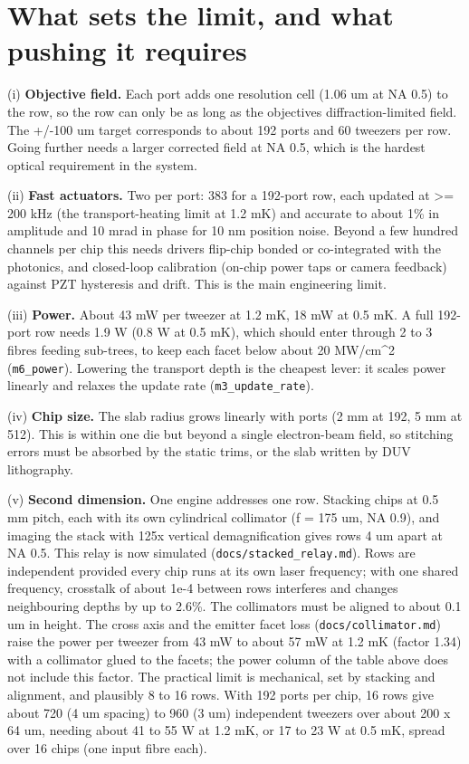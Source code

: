 \hypertarget{4-what-sets-the-limit-and-what-pushing-it-requires}{%
\section{What sets the limit, and what pushing it
requires}\label{scaling-4-what-sets-the-limit-and-what-pushing-it-requires}}

(i) \textbf{Objective field.} Each port adds one resolution cell (1.06
um at NA 0.5) to the row, so the row can only be as long as the
objective\textquotesingle s diffraction-limited field. The +/-100 um
target corresponds to about 192 ports and 60 tweezers per row. Going
further needs a larger corrected field at NA 0.5, which is the hardest
optical requirement in the system.

(ii) \textbf{Fast actuators.} Two per port: 383 for a 192-port row, each
updated at \textgreater= 200 kHz (the transport-heating limit at 1.2 mK)
and accurate to about 1\% in amplitude and 10 mrad in phase for 10 nm
position noise. Beyond a few hundred channels per chip this needs
drivers flip-chip bonded or co-integrated with the photonics, and
closed-loop calibration (on-chip power taps or camera feedback) against
PZT hysteresis and drift. This is the main engineering limit.

(iii) \textbf{Power.} About 43 mW per tweezer at 1.2 mK, 18 mW at 0.5
mK. A full 192-port row needs 1.9 W (0.8 W at 0.5 mK), which should
enter through 2 to 3 fibres feeding sub-trees, to keep each facet below
about 20 MW/cm\^{}2 (\texttt{m6\_power}). Lowering the transport depth
is the cheapest lever: it scales power linearly and relaxes the update
rate (\texttt{m3\_update\_rate}).

(iv) \textbf{Chip size.} The slab radius grows linearly with ports (2 mm
at 192, 5 mm at 512). This is within one die but beyond a single
electron-beam field, so stitching errors must be absorbed by the static
trims, or the slab written by DUV lithography.

(v) \textbf{Second dimension.} One engine addresses one row. Stacking
chips at 0.5 mm pitch, each with its own cylindrical collimator (f = 175
um, NA 0.9), and imaging the stack with 125x vertical demagnification
gives rows 4 um apart at NA 0.5. This relay is now simulated
(\texttt{docs/stacked\_relay.md}). Rows are independent provided every
chip runs at its own laser frequency; with one shared frequency,
crosstalk of about 1e-4 between rows interferes and changes neighbouring
depths by up to 2.6\%. The collimators must be aligned to about 0.1 um
in height. The cross axis and the emitter facet loss
(\texttt{docs/collimator.md}) raise the power per tweezer from 43 mW to
about 57 mW at 1.2 mK (factor 1.34) with a collimator glued to the
facets; the power column of the table above does not include this
factor. The practical limit is mechanical, set by stacking and
alignment, and plausibly 8 to 16 rows. With 192 ports per chip, 16 rows
give about 720 (4 um spacing) to 960 (3 um) independent tweezers over
about 200 x 64 um, needing about 41 to 55 W at 1.2 mK, or 17 to 23 W at
0.5 mK, spread over 16 chips (one input fibre each).

